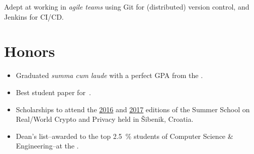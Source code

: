 \documentclass[%
version=last,%
fontsize=11pt,%
paper=A4,%
headinclude=false,%
footinclude=false,%
headlines=0,%
footlines=0,%
areasetadvanced,%
toc=bibnumbered,%
]{scrartcl}%
\begin{document}
\begin{minipage}[t]{.4\textwidth}
  \begingroup%
  \small%
  Adept at working in \emph{agile teams} using Git for (distributed) version
  control, and Jenkins for CI/CD\@.\par%
  \endgroup%

  \section{Honors}%
  \label{sec:honors}

  \begin{itemize}[leftmargin=*]
  \item Graduated \emph{summa cum laude} with a perfect GPA from the
    .
  \item Best student paper
    for~\autocite{Gjorgjevski:Combining_LWE-Solving_Algorithms}.
  \item Scholarships to attend the
    \href{http://summerschool-croatia.cs.ru.nl/2016/}{2016} and
    \href{http://summerschool-croatia.cs.ru.nl/2017/}{2017} editions of the
    Summer School on Real\-/World Crypto and Privacy held in Šibenik, Croatia.
  \item Dean’s list\---awarded to the top \SI{2.5}{\percent} students of
    Computer Science \& Engineering\---at the .
  \end{itemize}
\end{minipage}
\end{document}
